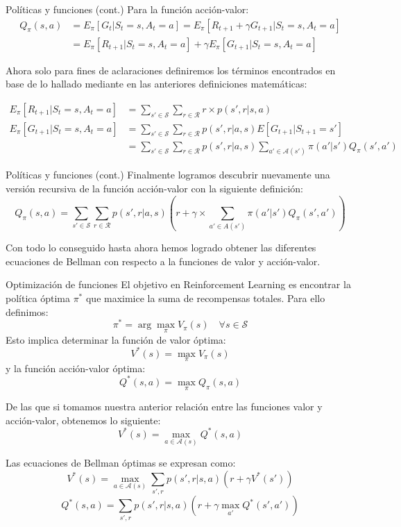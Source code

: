 \documentclass[10pt]{beamer}
\begin{document}
		\begin{frame}{Políticas y funciones (cont.)}
			Para la función acción-valor:
			\[
			\begin{aligned}
				Q_{\pi}(s, a) &= E_{\pi}[G_t | S_t = s, A_t = a] = E_{\pi}[R_{t+1} + \gamma G_{t+1} | S_t = s, A_t = a] \\
				&= E_{\pi}[R_{t+1} | S_t = s, A_t = a] + \gamma E_{\pi}[G_{t+1} | S_t = s, A_t = a]
			\end{aligned}
			\]

			Ahora solo para fines de aclaraciones definiremos los términos encontrados en base de lo hallado mediante en las anteriores definiciones matemáticas:

			\[
			\begin{aligned}
				E_{\pi}[R_{t+1} | S_t = s, A_t = a] &= \sum_{s' \in \mathcal{S}} \sum_{r \in \mathcal{R}} r \times p(s', r | s , a) \\
				E_{\pi}[G_{t+1} | S_t = s, A_t = a] &= \sum_{s' \in \mathcal{S}} \sum_{r \in \mathcal{R}} p (s', r | a, s) E[G_{t+1} | S_{t+1} = s'] \\
				&= \sum_{s' \in \mathcal{S}} \sum_{r \in \mathcal{R}} p (s', r | a, s) \sum_{a' \in \mathcal{A}(s')} \pi(a' | s') Q_{\pi}(s', a')
			\end{aligned}
			\]
		\end{frame}

		\begin{frame}{Políticas y funciones (cont.)}
			Finalmente logramos descubrir nuevamente una versión recursiva de la función acción-valor con la siguiente definición:
			\[
			Q_{\pi}(s, a) = \sum_{s' \in \mathcal{S}} \sum_{r \in \mathcal{R}} p(s', r | a, s) (r + \gamma \times \sum_{a' \in A(s')} \pi(a' | s') 	Q_{\pi}(s', a'))
			\]

			Con todo lo conseguido hasta ahora hemos logrado obtener las diferentes ecuaciones de Bellman con respecto a la funciones de valor y acción-valor.
		\end{frame}

		\begin{frame}{Optimización de funciones}
			\small
            El objetivo en Reinforcement Learning es encontrar la política óptima $\pi^*$ que maximice la suma de recompensas totales. Para ello definimos:
            \[
            \pi^* = \arg\max_\pi V_\pi(s) \quad \forall s \in \mathcal{S}
            \]
            Esto implica determinar la función de valor óptima:
            \[
            V^*(s) = \max_\pi V_\pi(s)
            \]
            y la función acción-valor óptima:
            \[
            Q^*(s,a) = \max_\pi Q_\pi(s,a)
            \]

			De las que si tomamos nuestra anterior relación entre las funciones valor y acción-valor, obtenemos lo siguiente:
			\[
			V^*(s) = \max_{a \in \mathcal{A}(s)} Q^*(s, a)
			\]


            Las ecuaciones de Bellman óptimas se expresan como:
            \[
            V^*(s) = \max_{a \in \mathcal{A}(s)} \sum_{s',r} p(s',r|s,a) \left( r + \gamma V^*(s') \right)
            \]
            \[
            Q^*(s,a) = \sum_{s',r} p(s',r|s,a) \left( r + \gamma \max_{a'} Q^*(s',a') \right)
            \]
        \end{frame}
	
\end{document}
